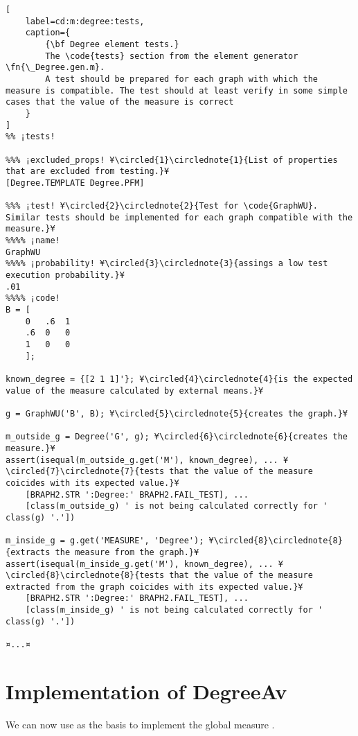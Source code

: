 \documentclass{tufte-handout}
\begin{document}
\begin{lstlisting}[
	label=cd:m:degree:tests,
	caption={
		{\bf Degree element tests.}
		The \code{tests} section from the element generator \fn{\_Degree.gen.m}.
		A test should be prepared for each graph with which the measure is compatible. The test should at least verify in some simple cases that the value of the measure is correct 
	}
]
%% ¡tests!

%%% ¡excluded_props! ¥\circled{1}\circlednote{1}{List of properties that are excluded from testing.}¥
[Degree.TEMPLATE Degree.PFM] 

%%% ¡test! ¥\circled{2}\circlednote{2}{Test for \code{GraphWU}. Similar tests should be implemented for each graph compatible with the measure.}¥
%%%% ¡name!
GraphWU
%%%% ¡probability! ¥\circled{3}\circlednote{3}{assings a low test execution probability.}¥
.01
%%%% ¡code!
B = [
    0   .6  1
    .6  0   0
    1   0   0
    ];

known_degree = {[2 1 1]'}; ¥\circled{4}\circlednote{4}{is the expected value of the measure calculated by external means.}¥

g = GraphWU('B', B); ¥\circled{5}\circlednote{5}{creates the graph.}¥

m_outside_g = Degree('G', g); ¥\circled{6}\circlednote{6}{creates the measure.}¥
assert(isequal(m_outside_g.get('M'), known_degree), ... ¥\circled{7}\circlednote{7}{tests that the value of the measure coicides with its expected value.}¥ 
    [BRAPH2.STR ':Degree:' BRAPH2.FAIL_TEST], ...
    [class(m_outside_g) ' is not being calculated correctly for ' class(g) '.'])

m_inside_g = g.get('MEASURE', 'Degree'); ¥\circled{8}\circlednote{8}{extracts the measure from the graph.}¥
assert(isequal(m_inside_g.get('M'), known_degree), ... ¥\circled{8}\circlednote{8}{tests that the value of the measure extracted from the graph coicides with its expected value.}¥
    [BRAPH2.STR ':Degree:' BRAPH2.FAIL_TEST], ...
    [class(m_inside_g) ' is not being calculated correctly for ' class(g) '.'])

¤...¤
\end{lstlisting}

\section{Implementation of DegreeAv}

We can now use  as the basis to implement the global measure .
\end{document}
